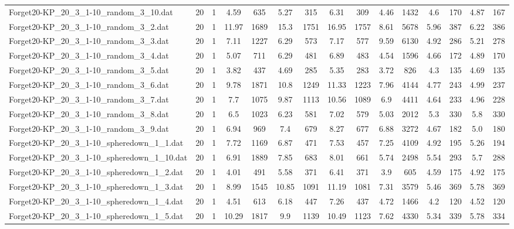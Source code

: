 \begin{table}[!ht]
{\begin{tabular}{lcccccccccccccc}
Forget20-KP\_20\_3\_1-10\_random\_3\_10.dat & 20 & 1 & 4.59 & 635 & 5.27 & 315 & 6.31 & 309 & 4.46 & 1432 & 4.6 & 170 & 4.87 & 167 \\
Forget20-KP\_20\_3\_1-10\_random\_3\_2.dat & 20 & 1 & 11.97 & 1689 & 15.3 & 1751 & 16.95 & 1757 & 8.61 & 5678 & 5.96 & 387 & 6.22 & 386 \\
Forget20-KP\_20\_3\_1-10\_random\_3\_3.dat & 20 & 1 & 7.11 & 1227 & 6.29 & 573 & 7.17 & 577 & 9.59 & 6130 & 4.92 & 286 & 5.21 & 278 \\
Forget20-KP\_20\_3\_1-10\_random\_3\_4.dat & 20 & 1 & 5.07 & 711 & 6.29 & 481 & 6.89 & 483 & 4.54 & 1596 & 4.66 & 172 & 4.89 & 170 \\
Forget20-KP\_20\_3\_1-10\_random\_3\_5.dat & 20 & 1 & 3.82 & 437 & 4.69 & 285 & 5.35 & 283 & 3.72 & 826 & 4.3 & 135 & 4.69 & 135 \\
Forget20-KP\_20\_3\_1-10\_random\_3\_6.dat & 20 & 1 & 9.78 & 1871 & 10.8 & 1249 & 11.33 & 1223 & 7.96 & 4144 & 4.77 & 243 & 4.99 & 237 \\
Forget20-KP\_20\_3\_1-10\_random\_3\_7.dat & 20 & 1 & 7.7 & 1075 & 9.87 & 1113 & 10.56 & 1089 & 6.9 & 4411 & 4.64 & 233 & 4.96 & 228 \\
Forget20-KP\_20\_3\_1-10\_random\_3\_8.dat & 20 & 1 & 6.5 & 1023 & 6.23 & 581 & 7.02 & 579 & 5.03 & 2012 & 5.3 & 330 & 5.8 & 330 \\
Forget20-KP\_20\_3\_1-10\_random\_3\_9.dat & 20 & 1 & 6.94 & 969 & 7.4 & 679 & 8.27 & 677 & 6.88 & 3272 & 4.67 & 182 & 5.0 & 180 \\
Forget20-KP\_20\_3\_1-10\_spheredown\_1\_1.dat & 20 & 1 & 7.72 & 1169 & 6.87 & 471 & 7.53 & 457 & 7.25 & 4109 & 4.92 & 195 & 5.26 & 194 \\
Forget20-KP\_20\_3\_1-10\_spheredown\_1\_10.dat & 20 & 1 & 6.91 & 1889 & 7.85 & 683 & 8.01 & 661 & 5.74 & 2498 & 5.54 & 293 & 5.7 & 288 \\
Forget20-KP\_20\_3\_1-10\_spheredown\_1\_2.dat & 20 & 1 & 4.01 & 491 & 5.58 & 371 & 6.41 & 371 & 3.9 & 605 & 4.59 & 175 & 4.92 & 175 \\
Forget20-KP\_20\_3\_1-10\_spheredown\_1\_3.dat & 20 & 1 & 8.99 & 1545 & 10.85 & 1091 & 11.19 & 1081 & 7.31 & 3579 & 5.46 & 369 & 5.78 & 369 \\
Forget20-KP\_20\_3\_1-10\_spheredown\_1\_4.dat & 20 & 1 & 4.51 & 613 & 6.18 & 447 & 7.26 & 437 & 4.72 & 1466 & 4.2 & 120 & 4.52 & 120 \\
Forget20-KP\_20\_3\_1-10\_spheredown\_1\_5.dat & 20 & 1 & 10.29 & 1817 & 9.9 & 1139 & 10.49 & 1123 & 7.62 & 4330 & 5.34 & 339 & 5.78 & 334 \\

\end{tabular}}
\end{table}
